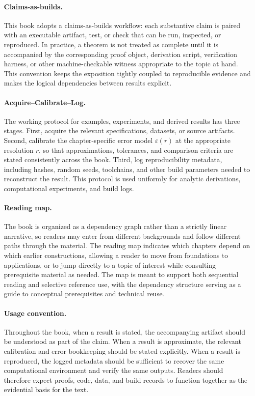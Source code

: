 \paragraph{Claims-as-builds.}
This book adopts a claims-as-builds workflow: each substantive claim is paired with an executable artifact, test, or check that can be run, inspected, or reproduced. In practice, a theorem is not treated as complete until it is accompanied by the corresponding proof object, derivation script, verification harness, or other machine-checkable witness appropriate to the topic at hand. This convention keeps the exposition tightly coupled to reproducible evidence and makes the logical dependencies between results explicit.

\paragraph{Acquire--Calibrate--Log.}
The working protocol for examples, experiments, and derived results has three stages. First, acquire the relevant specifications, datasets, or source artifacts. Second, calibrate the chapter-specific error model \(\varepsilon(r)\) at the appropriate resolution \(r\), so that approximations, tolerances, and comparison criteria are stated consistently across the book. Third, log reproducibility metadata, including hashes, random seeds, toolchains, and other build parameters needed to reconstruct the result. This protocol is used uniformly for analytic derivations, computational experiments, and build logs.

\paragraph{Reading map.}
The book is organized as a dependency graph rather than a strictly linear narrative, so readers may enter from different backgrounds and follow different paths through the material. The reading map indicates which chapters depend on which earlier constructions, allowing a reader to move from foundations to applications, or to jump directly to a topic of interest while consulting prerequisite material as needed. The map is meant to support both sequential reading and selective reference use, with the dependency structure serving as a guide to conceptual prerequisites and technical reuse.

\paragraph{Usage convention.}
Throughout the book, when a result is stated, the accompanying artifact should be understood as part of the claim. When a result is approximate, the relevant calibration and error bookkeeping should be stated explicitly. When a result is reproduced, the logged metadata should be sufficient to recover the same computational environment and verify the same outputs. Readers should therefore expect proofs, code, data, and build records to function together as the evidential basis for the text.

